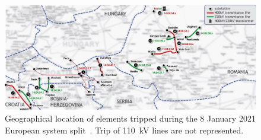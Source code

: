 \begin{figure}
    \centering
    \includegraphics[width = \textwidth]{Figs/SystemSplitTimeline2021.pdf}
    \caption{Geographical location of elements tripped during the 8 January 2021 European system split~\cite{ENTSOESplitJan2021}. Trip of 110~kV lines are not represented.}
    \label{fig:split2021_timeline}
\end{figure}

